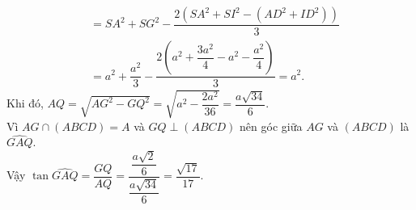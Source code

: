 \begin{ex}
{\begin{align*}
	&=SA^2+SG^2-\dfrac{2(SA^2+SI^2-(AD^2+ID^2))}{3}\\
	&=a^2+\dfrac{a^2}{3}-\dfrac{2\left(a^2+\dfrac{3a^2}{4}-a^2-\dfrac{a^2}{4}\right)}{3}=a^2.
	\end{align*}
	Khi đó, $AQ=\sqrt{AG^2-GQ^2}=\sqrt{a^2-\dfrac{2a^2}{36}}=\dfrac{a\sqrt{34}}{6}$.\\
	Vì $AG\cap (ABCD)=A$ và $GQ\perp (ABCD)$ nên góc giữa $AG$ và $(ABCD)$ là $\widehat{GAQ}$.\\
	Vậy $\tan\widehat{GAQ}=\dfrac{GQ}{AQ}=\dfrac{\dfrac{a\sqrt{2}}{6}}{\dfrac{a\sqrt{34}}{6}}=\dfrac{\sqrt{17}}{17}$.	
	}
\end{ex}